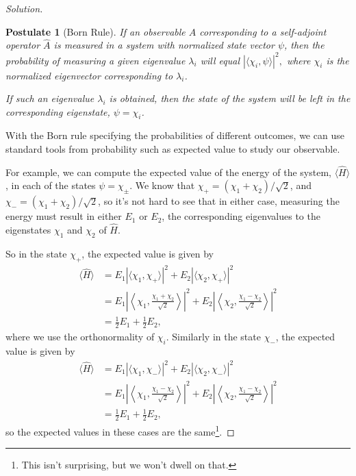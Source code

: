 \documentclass[a4paper]{scrartcl}
\newtheorem*{postulate}{Postulate}
\begin{document}
\begin{proof}[Solution]
    \begin{postulate}[Born Rule]
        If an observable $A$ corresponding to a self-adjoint operator $\hat{A}$ is measured in a system with normalized state vector $\psi$, then the probability of measuring a given eigenvalue $\lambda_i$ will equal
        $
        |\langle \chi_i, \psi \rangle|^2,
        $
        where $\chi_i$ is the normalized eigenvector corresponding to $\lambda_i$.

        If such an eigenvalue $\lambda_i$ is obtained, then the state of the system will be left in the corresponding eigenstate, $\psi = \chi_i$.
    \end{postulate}

    With the Born rule specifying the probabilities of different outcomes, we can use standard tools from probability such as expected value to study our observable.
    
    For example, we can compute the expected value of the energy of the system, $\langle \hat{H} \rangle$, in each of the states $\psi = \chi_{\pm}$. We know that $\chi_+ = (\chi_1 + \chi_2)/\sqrt{2}$, and $\chi_- = (\chi_1 + \chi_2)/\sqrt{2}$, so it's not hard to see that in either case, measuring the energy must result in either $E_1$ or $E_2$, the corresponding eigenvalues to the eigenstates $\chi_1$ and $\chi_2$ of $\hat{H}$.

    So in the state $\chi_+$, the expected value is given by
    \begin{align*}
    \langle \hat{H}\rangle &= E_1 |\langle \chi_1, \chi_+\rangle|^2 + E_2 |\langle \chi_2, \chi_+\rangle|^2 \\
    &= E_1 \left|\left\langle \chi_1, \frac{\chi_1 + \chi_2}{\sqrt{2}} \right\rangle\right|^2 + E_2 \left|\left\langle \chi_2, \frac{\chi_1 - \chi_2}{\sqrt{2}} \right\rangle\right|^2 \\
    &= \frac{1}{2}E_1 + \frac{1}{2}E_2,
    \end{align*}
    where we use the orthonormality of $\chi_i$. Similarly in the state $\chi_-$, the expected value is given by
    \begin{align*}
        \langle \hat{H}\rangle &= E_1 |\langle \chi_1, \chi_-\rangle|^2 + E_2 |\langle \chi_2, \chi_-\rangle|^2 \\
        &= E_1 \left|\left\langle \chi_1, \frac{\chi_1 - \chi_2}{\sqrt{2}} \right\rangle\right|^2 + E_2 \left|\left\langle \chi_2, \frac{\chi_1 - \chi_2}{\sqrt{2}} \right\rangle\right|^2 \\
        &= \frac{1}{2}E_1 + \frac{1}{2}E_2,
        \end{align*}
    so the expected values in these cases are the same\footnote{This isn't surprising, but we won't dwell on that.}.



\end{proof}
\end{document}
